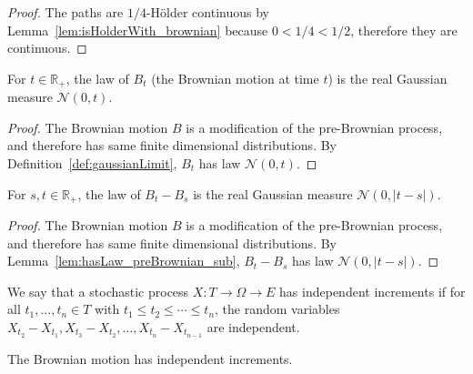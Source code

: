 \begin{proof}\leanok
The paths are $1/4$-Hölder continuous by Lemma~\ref{lem:isHolderWith_brownian} because $0 < 1/4 < 1/2$, therefore they are continuous.
\end{proof}


\begin{lemma}\label{lem:hasLaw_brownian_eval}
  \leanok
For $t \in \mathbb{R}_+$, the law of $B_t$ (the Brownian motion at time $t$) is the real Gaussian measure $\mathcal{N}(0,t)$.
\end{lemma}

\begin{proof}\leanok
The Brownian motion $B$ is a modification of the pre-Brownian process, and therefore has same finite dimensional distributions. By Definition~\ref{def:gaussianLimit}, $B_t$ has law $\mathcal{N}(0,t)$.
\end{proof}


\begin{lemma}\label{lem:hasLaw_brownian_sub}
  \leanok
For $s, t \in \mathbb{R}_+$, the law of $B_t - B_s$ is the real Gaussian measure $\mathcal{N}(0,\vert t - s \vert)$.
\end{lemma}

\begin{proof}\leanok
The Brownian motion $B$ is a modification of the pre-Brownian process, and therefore has same finite dimensional distributions. By Lemma~\ref{lem:hasLaw_preBrownian_sub}, $B_t - B_s$ has law $\mathcal{N}(0,\vert t - s \vert)$.
\end{proof}


\begin{definition}\label{def:HasIndepIncrements}
  \leanok
We say that a stochastic process $X : T \to \Omega \to E$ has independent increments if for all $t_1, \ldots, t_n \in T$ with $t_1 \le t_2 \le \cdots \le t_n$, the random variables $X_{t_2} - X_{t_1}, X_{t_3} - X_{t_2}, \ldots, X_{t_n} - X_{t_{n-1}}$ are independent.
\end{definition}


\begin{lemma}\label{lem:hasIndepIncrements_brownian}
  \leanok
The Brownian motion has independent increments.
\end{lemma}

